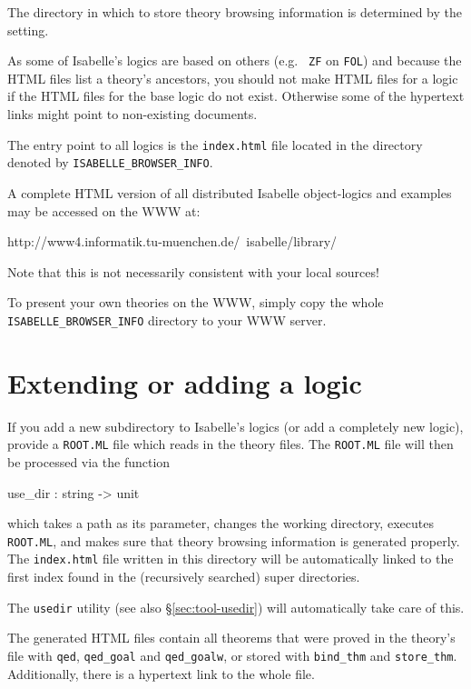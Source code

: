 \medskip The directory in which to store theory browsing information
is determined by the  setting.

\medskip As some of Isabelle's logics are based on others (e.g. {\tt
  ZF} on {\tt FOL}) and because the HTML files list a theory's
ancestors, you should not make HTML files for a logic if the HTML
files for the base logic do not exist. Otherwise some of the hypertext
links might point to non-existing documents.

The entry point to all logics is the {\tt index.html} file located in
the directory denoted by \texttt{ISABELLE_BROWSER_INFO}.

A complete HTML version of all distributed Isabelle object-logics and
examples may be accessed on the WWW at:
\begin{ttbox}
http://www4.informatik.tu-muenchen.de/~isabelle/library/
\end{ttbox}
Note that this is not necessarily consistent with your local sources!

To present your own theories on the WWW, simply copy the whole
\texttt{ISABELLE_BROWSER_INFO} directory to your WWW server.


\section{Extending or adding a logic}

If you add a new subdirectory to Isabelle's logics (or add a
completely new logic), provide a {\tt ROOT.ML} file which reads in the
theory files. The {\tt ROOT.ML} file will then be processed via the
function

\begin{ttbox}
use_dir : string -> unit
\end{ttbox}

which takes a path as its parameter, changes the working directory,
executes {\tt ROOT.ML}, and makes sure that theory browsing
information is generated properly. The {\tt index.html} file written
in this directory will be automatically linked to the first index
found in the (recursively searched) super directories.

The \texttt{usedir} utility (see also \S\ref{sec:tool-usedir}) will
automatically take care of this.

\medskip The generated HTML files contain all theorems that were
proved in the theory's \ML{} file with {\tt qed}, {\tt qed_goal} and
{\tt qed_goalw}, or stored with {\tt bind_thm} and {\tt store_thm}.
Additionally, there is a hypertext link to the whole \ML{} file.

